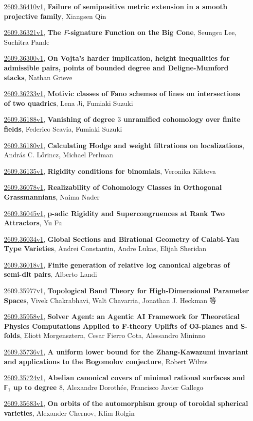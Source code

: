 \documentclass[9pt, a4paper]{article}
\theoremstyle{plain}
\theoremstyle{definition}
\theoremstyle{remark}
\newcommand{\arxiv}[3]{\href{https://arxiv.org/abs/#1}{#1}, \textbf{\textcolor{arxivblue}{#2}}, #3}
\begin{document}
\arxiv{2609.36410v1}{Failure of semipositive metric extension in a smooth projective family}{Xiangsen Qin}

\arxiv{2609.36321v1}{The $F$-signature Function on the Big Cone}{Seungsu Lee, Suchitra Pande}

\arxiv{2609.36300v1}{On Vojta's harder implication, height inequalities for admissible pairs, points of bounded degree and Deligne-Mumford stacks}{Nathan Grieve}

\arxiv{2609.36233v1}{Motivic classes of Fano schemes of lines on intersections of two quadrics}{Lena Ji, Fumiaki Suzuki}

\arxiv{2609.36188v1}{Vanishing of degree $3$ unramified cohomology over finite fields}{Federico Scavia, Fumiaki Suzuki}

\arxiv{2609.36180v1}{Calculating Hodge and weight filtrations on localizations}{András C. Lőrincz, Michael Perlman}

\arxiv{2609.36135v1}{Rigidity conditions for binomials}{Veronika Kikteva}

\arxiv{2609.36078v1}{Realizability of Cohomology Classes in Orthogonal Grassmannians}{Naima Nader}

\arxiv{2609.36045v1}{p-adic Rigidity and Supercongruences at Rank Two Attractors}{Yu Fu}

\arxiv{2609.36034v1}{Global Sections and Birational Geometry of Calabi-Yau Type Varieties}{Andrei Constantin, Andre Lukas, Elijah Sheridan}

\arxiv{2609.36018v1}{Finite generation of relative log canonical algebras of semi-dlt pairs}{Alberto Landi}

\arxiv{2609.35977v1}{Topological Band Theory for High-Dimensional Parameter Spaces}{Vivek Chakrabhavi, Walt Chavarria, Jonathan J. Heckman 等}

\arxiv{2609.35958v1}{Solver Agent: an Agentic AI Framework for Theoretical Physics Computations Applied to F-theory Uplifts of O3-planes and S-folds}{Eliott Morgensztern, Cesar Fierro Cota, Alessandro Mininno}

\arxiv{2609.35736v1}{A uniform lower bound for the Zhang-Kawazumi invariant and applications to the Bogomolov conjecture}{Robert Wilms}

\arxiv{2609.35724v1}{Abelian canonical covers of minimal rational surfaces and $\mathbb F_1$ up to degree $8$}{Alexandre Dorothée, Francisco Javier Gallego}

\arxiv{2609.35683v1}{On orbits of the automorphism group of toroidal spherical varieties}{Alexander Chernov, Klim Rolgin}
\end{document}

